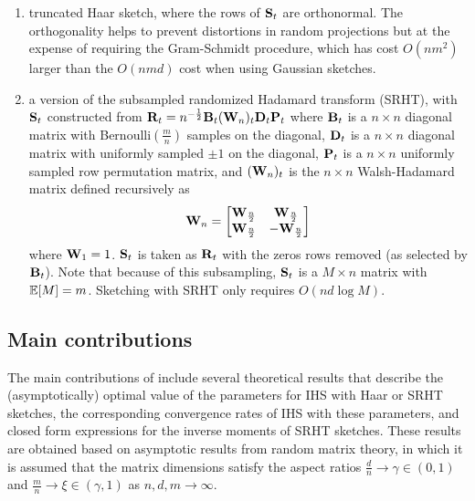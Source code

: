 \begin{enumerate}

\item
truncated Haar sketch, where the rows of $\mathbf{S}_t$ are orthonormal. The orthogonality helps to prevent distortions in random projections but at the expense of requiring the Gram-Schmidt procedure, which has cost $O(nm^2)$ larger than the $O(nmd)$ cost when using Gaussian sketches.

\item
a version of the subsampled randomized Hadamard transform (SRHT), with $\mathbf{S}_t$ constructed from $\mathbf{R}_t=n^{-\frac{1}{2}}\mathbf{B}_t(\mathbf{W}_n)_t\mathbf{D}_t\mathbf{P}_t$ where $\mathbf{B}_t$ is a $n\times n$ diagonal matrix with \iid Bernoulli$\left(\frac{m}{n}\right)$ samples on the diagonal, $\mathbf{D}_t$ is a $n\times n$ diagonal matrix with uniformly sampled $\pm1$ on the diagonal, $\mathbf{P}_t$ is a $n\times n$ uniformly sampled row permutation matrix, and $(\mathbf{W}_n)_t$ is the $n\times n$ Walsh-Hadamard matrix defined recursively as
\[
\mathbf{W}_n =
\begin{bmatrix}
\mathbf{W}_\frac{n}{2} & \mathbf{W}_\frac{n}{2} \\
\mathbf{W}_\frac{n}{2} & -\mathbf{W}_\frac{n}{2}
\end{bmatrix}
\]
where $\mathbf{W}_1=1$. $\mathbf{S}_t$ is taken as $\mathbf{R}_t$ with the zeros rows removed (as selected by $\mathbf{B}_t$). Note that because of this subsampling, $\mathbf{S}_t$ is a $M\times n$ matrix with $\mathbb{E}[M]=m$. Sketching with SRHT only requires $O(nd\log M)$.

\end{enumerate}

\subsection{Main contributions}

The main contributions of \citet{Lacotte:2020} include several theoretical results that describe the (asymptotically) optimal value of the parameters for IHS with Haar or SRHT sketches, the corresponding convergence rates of IHS with these parameters, and closed form expressions for the inverse moments of SRHT sketches. These results are obtained based on asymptotic results from random matrix theory, in which it is assumed that the matrix dimensions satisfy the aspect ratios $\frac{d}{n}\rightarrow\gamma\in(0,1)$ and $\frac{m}{n}\rightarrow\xi\in(\gamma,1)$ as $n,d,m\rightarrow\infty$.
\\

